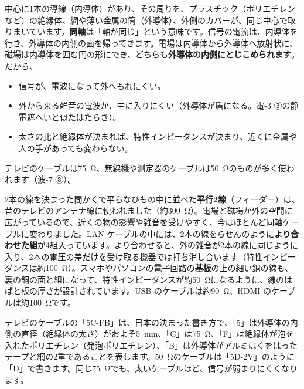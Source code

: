 中心に1本の導線（内導体）があり、その周りを、プラスチック（ポリエチレンなど）の絶縁体、網や薄い金属の筒（外導体）、外側のカバーが、同じ中心で取りまいています。\textbf{同軸}は「軸が同じ」という意味です。信号の電流は、内導体を行き、外導体の内側の面を帰ってきます。電場は内導体から外導体へ放射状に、磁場は内導体を囲む円の形にでき、どちらも\textbf{外導体の内側にとじこめられます}。だから、
\begin{itemize}[leftmargin=1.2\zw, itemsep=1pt, topsep=1pt, label={\color{bkTheme}●}]
\item 信号が、電波になって外へもれにくい。
\item 外から来る雑音の電波が、中に入りにくい（外導体が盾になる。電-3 ③の静電遮へいと似たはたらき）。
\item 太さの比と絶縁体が決まれば、特性インピーダンスが決まり、近くに金属や人の手があっても変わらない。
\end{itemize}
テレビのケーブルは\qty{75}{\ohm}、無線機や測定器のケーブルは\qty{50}{\ohm}のものが多く使われます（波-7 ⑧）。

\begin{phmodel}
\end{phmodel}

2本の線を決まった間かくで平らなひもの中に並べた\textbf{平行2線}（フィーダー）は、昔のテレビのアンテナ線に使われました（約\qty{300}{\ohm}）。電場と磁場が外の空間に広がっているので、近くの物の影響や雑音を受けやすく、今はほとんど同軸ケーブルに変わりました。LAN ケーブルの中には、2本の線をらせんのように\textbf{より合わせた組}が4組入っています。より合わせると、外の雑音が2本の線に同じように入り、2本の電圧の差だけを受け取る機器では打ち消し合います（特性インピーダンスは約\qty{100}{\ohm}）。スマホやパソコンの電子回路の\textbf{基板}の上の細い銅の線も、裏の銅の面と組になって、特性インピーダンスが約\qty{50}{\ohm}になるように、線のはばと板の厚さが設計されています。USB のケーブルは約\qty{90}{\ohm}、HDMI のケーブルは約\qty{100}{\ohm}です。

\begin{phmijika}[ケーブルの数字を読む]
テレビのケーブルの「5C-FB」は、日本の決まった書き方で、「5」は外導体の内側の直径（絶縁体の太さ）がおよそ\qty{5}{mm}、「C」は\qty{75}{\ohm}、「F」は絶縁体が泡を入れたポリエチレン（発泡ポリエチレン）、「B」は外導体がアルミはくをはったテープと網の2重であることを表します。\qty{50}{\ohm}のケーブルは「5D-2V」のように「D」で書きます。同じ\qty{75}{\ohm}でも、太いケーブルほど、信号が弱まりにくくなります。
\end{phmijika}



